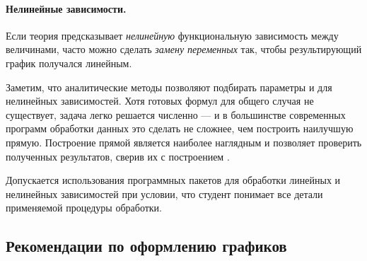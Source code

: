 \paragraph{Нелинейные зависимости.}

Если теория предсказывает \emph{нелинейную} функциональную зависимость
между величинами, часто можно сделать \emph{замену переменных} так,
чтобы результирующий график получался линейным.

Заметим, что аналитические методы позволяют подбирать параметры и для нелинейных
зависимостей. Хотя готовых формул для общего случая не существует, задача
легко решается численно --- и в большинстве современных программ обработки
данных это сделать не сложнее, чем построить наилучшую прямую.
Построение прямой является наиболее наглядным и позволяет проверить
 полученных результатов, сверив их с построением
 .




Допускается использования программных пакетов для обработки линейных и нелинейных зависимостей при условии, что студент понимает все детали 
применяемой процедуры обработки.

\subsection{Рекомендации по оформлению графиков}

